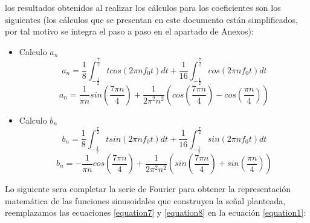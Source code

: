 \documentclass[11pt,a4paper,twocolumn]{article}
\begin{document}
    los resultados obtenidos al realizar los cálculos para los coeficientes son los siguientes (los cálculos que 
    se presentan en este documento están simplificados, por tal motivo se integra el paso a paso en el apartado de 
    Anexos):

    \begin{itemize}
        \item Calculo $a_{n}$
            \begin{equation*}
                a_{n}=\frac{1}{8}\int_{-\frac{1}{2}}^{\frac{7}{2}} tcos(2\pi nf_0t)dt + 
                \frac{1}{16} \int_{-\frac{1}{2}}^{\frac{7}{2}} cos(2\pi nf_0t)dt
            \end{equation*}
            \begin{equation}
                a_{n}=\frac{1}{\pi n} sin\left(\frac{7\pi n}{4}\right)+\frac{1}{2\pi^2 n^2}\left(cos\left(\frac{7\pi n}{4}\right)-cos\left(\frac{\pi n}{4}\right)\right)
                \label{equation7}
            \end{equation}
        \item Calculo $b_{n}$
            \begin{equation*}
                b_{n}=\frac{1}{8}\int_{-\frac{1}{2}}^{\frac{7}{2}} tsin(2\pi nf_0t)dt + 
                \frac{1}{16} \int_{-\frac{1}{2}}^{\frac{7}{2}} sin(2\pi nf_0t)dt
            \end{equation*}
            \begin{equation}
                b_{n}=-\frac{1}{\pi n} cos\left(\frac{7\pi n}{4}\right)+\frac{1}{2\pi^2 n^2}\left(sin\left(\frac{7\pi n}{4}\right)+sin\left(\frac{\pi n}{4}\right)\right)
                \label{equation8}
            \end{equation}
    \end{itemize}
    
    Lo siguiente sera completar la serie de Fourier para obtener la representación matemática de las funciones sinusoidales 
    que construyen la señal planteada, reemplazamos las ecuaciones \ref{equation7} y \ref{equation8} en la ecuación 
    \ref{equation1}:

\end{document}
